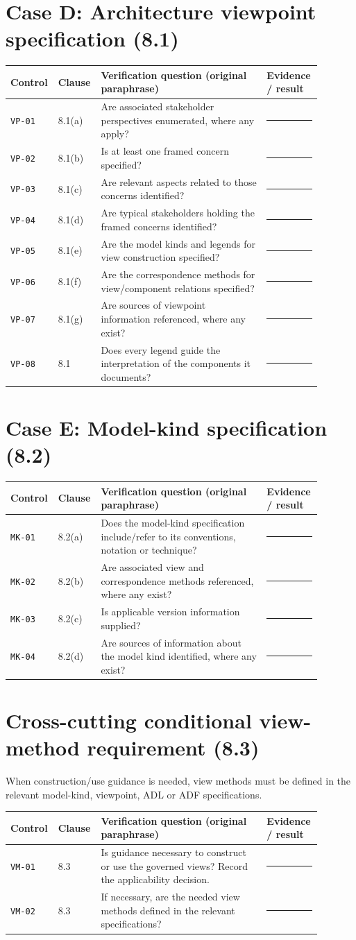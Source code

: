 \documentclass[11pt,letterpaper]{article}
\newcommand{\AuditingHead}{\begin{longtable}{p{0.10\linewidth}p{0.10\linewidth}p{0.52\linewidth}p{0.17\linewidth}}\toprule\textbf{Control}&\textbf{Clause}&\textbf{Verification question (original paraphrase)}&\textbf{Evidence / result}\\\midrule\endhead}
\newcommand{\AuditingEnd}{\bottomrule\end{longtable}}
\newcommand{\AuditRow}[4]{\texttt{#1} & #2 & #3 & #4\\}
\begin{document}
\section{Case D: Architecture viewpoint specification (8.1)}
\AuditingHead
\AuditRow{VP-01}{8.1(a)}{Are associated stakeholder perspectives enumerated, where any apply?}{\rule[-0.4em]{0pt}{2em}\rule{0.60\linewidth}{0.4pt}}
\AuditRow{VP-02}{8.1(b)}{Is at least one framed concern specified?}{\rule[-0.4em]{0pt}{2em}\rule{0.60\linewidth}{0.4pt}}
\AuditRow{VP-03}{8.1(c)}{Are relevant aspects related to those concerns identified?}{\rule[-0.4em]{0pt}{2em}\rule{0.60\linewidth}{0.4pt}}
\AuditRow{VP-04}{8.1(d)}{Are typical stakeholders holding the framed concerns identified?}{\rule[-0.4em]{0pt}{2em}\rule{0.60\linewidth}{0.4pt}}
\AuditRow{VP-05}{8.1(e)}{Are the model kinds and legends for view construction specified?}{\rule[-0.4em]{0pt}{2em}\rule{0.60\linewidth}{0.4pt}}
\AuditRow{VP-06}{8.1(f)}{Are the correspondence methods for view/component relations specified?}{\rule[-0.4em]{0pt}{2em}\rule{0.60\linewidth}{0.4pt}}
\AuditRow{VP-07}{8.1(g)}{Are sources of viewpoint information referenced, where any exist?}{\rule[-0.4em]{0pt}{2em}\rule{0.60\linewidth}{0.4pt}}
\AuditRow{VP-08}{8.1}{Does every legend guide the interpretation of the components it documents?}{\rule[-0.4em]{0pt}{2em}\rule{0.60\linewidth}{0.4pt}}
\AuditingEnd

\section{Case E: Model-kind specification (8.2)}
\AuditingHead
\AuditRow{MK-01}{8.2(a)}{Does the model-kind specification include/refer to its conventions, notation or technique?}{\rule[-0.4em]{0pt}{2em}\rule{0.60\linewidth}{0.4pt}}
\AuditRow{MK-02}{8.2(b)}{Are associated view and correspondence methods referenced, where any exist?}{\rule[-0.4em]{0pt}{2em}\rule{0.60\linewidth}{0.4pt}}
\AuditRow{MK-03}{8.2(c)}{Is applicable version information supplied?}{\rule[-0.4em]{0pt}{2em}\rule{0.60\linewidth}{0.4pt}}
\AuditRow{MK-04}{8.2(d)}{Are sources of information about the model kind identified, where any exist?}{\rule[-0.4em]{0pt}{2em}\rule{0.60\linewidth}{0.4pt}}
\AuditingEnd
\section{Cross-cutting conditional view-method requirement (8.3)}
\begin{Requirement}\FlagReq{} When construction/use guidance is needed, view methods must be defined in the relevant model-kind, viewpoint, ADL or ADF specifications. \end{Requirement}
\AuditingHead
\AuditRow{VM-01}{8.3}{Is guidance necessary to construct or use the governed views? Record the applicability decision.}{\rule[-0.4em]{0pt}{2em}\rule{0.60\linewidth}{0.4pt}}
\AuditRow{VM-02}{8.3}{If necessary, are the needed view methods defined in the relevant specifications?}{\rule[-0.4em]{0pt}{2em}\rule{0.60\linewidth}{0.4pt}}
\AuditingEnd
\end{document}
